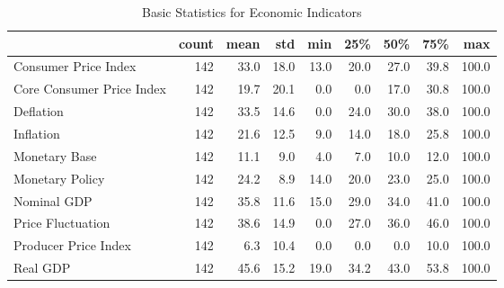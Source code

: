 \documentclass[a4paper,12pt]{article}
\begin{document}
        
        \begin{landscape}
        \begin{table}
\caption{Basic Statistics for Economic Indicators}
\label{tab:statistics_Economic_Indicators}
\begin{tabular}{lrrrrrrrr}
\toprule
 & count & mean & std & min & 25\% & 50\% & 75\% & max \\
\midrule
Consumer Price Index & 142 & 33.0 & 18.0 & 13.0 & 20.0 & 27.0 & 39.8 & 100.0 \\
Core Consumer Price Index & 142 & 19.7 & 20.1 & 0.0 & 0.0 & 17.0 & 30.8 & 100.0 \\
Deflation & 142 & 33.5 & 14.6 & 0.0 & 24.0 & 30.0 & 38.0 & 100.0 \\
Inflation & 142 & 21.6 & 12.5 & 9.0 & 14.0 & 18.0 & 25.8 & 100.0 \\
Monetary Base & 142 & 11.1 & 9.0 & 4.0 & 7.0 & 10.0 & 12.0 & 100.0 \\
Monetary Policy & 142 & 24.2 & 8.9 & 14.0 & 20.0 & 23.0 & 25.0 & 100.0 \\
Nominal GDP & 142 & 35.8 & 11.6 & 15.0 & 29.0 & 34.0 & 41.0 & 100.0 \\
Price Fluctuation & 142 & 38.6 & 14.9 & 0.0 & 27.0 & 36.0 & 46.0 & 100.0 \\
Producer Price Index & 142 & 6.3 & 10.4 & 0.0 & 0.0 & 0.0 & 10.0 & 100.0 \\
Real GDP & 142 & 45.6 & 15.2 & 19.0 & 34.2 & 43.0 & 53.8 & 100.0 \\
\bottomrule
\end{tabular}
\end{table}

        \end{landscape}
        
        
\end{document}
